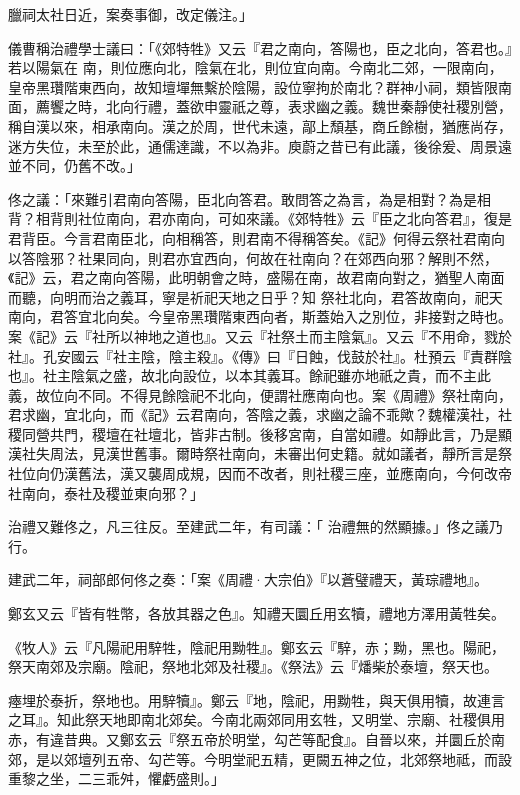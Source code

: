\begin{pinyinscope}
 臘祠太社日近，案奏事御，改定儀注。」



 儀曹稱治禮學士議曰：「《郊特牲》又云『君之南向，答陽也，臣之北向，答君也。』若以陽氣在
 南，則位應向北，陰氣在北，則位宜向南。今南北二郊，一限南向，皇帝黑瓚階東西向，故知壇墠無繫於陰陽，設位寧拘於南北？群神小祠，類皆限南面，薦饗之時，北向行禮，蓋欲申靈祇之尊，表求幽之義。魏世秦靜使社稷別營，稱自漢以來，相承南向。漢之於周，世代未遠，鄗上頹基，商丘餘樹，猶應尚存，迷方失位，未至於此，通儒達識，不以為非。庾蔚之昔已有此議，後徐爰、周景遠並不同，仍舊不改。」



 佟之議：「來難引君南向答陽，臣北向答君。敢問答之為言，為是相對？為是相背？相背則社位南向，君亦南向，可如來議。《郊特牲》云『臣之北向答君』，復是君背臣。今言君南臣北，向相稱答，則君南不得稱答矣。《記》何得云祭社君南向以答陰邪？社果同向，則君亦宜西向，何故在社南向？在郊西向邪？解則不然，《記》云，君之南向答陽，此明朝會之時，盛陽在南，故君南向對之，猶聖人南面而聽，向明而治之義耳，寧是祈祀天地之日乎？知
 祭社北向，君答故南向，祀天南向，君答宜北向矣。今皇帝黑瓚階東西向者，斯蓋始入之別位，非接對之時也。案《記》云『社所以神地之道也』。又云『社祭土而主陰氣』。又云『不用命，戮於社』。孔安國云『社主陰，陰主殺』。《傳》曰『日蝕，伐鼓於社』。杜預云『責群陰也』。社主陰氣之盛，故北向設位，以本其義耳。餘祀雖亦地祇之貴，而不主此義，故位向不同。不得見餘陰祀不北向，便謂社應南向也。案《周禮》祭社南向，君求幽，宜北向，而《記》云君南向，答陰之義，求幽之論不乖歟？魏權漢社，社稷同營共門，稷壇在社壇北，皆非古制。後移宮南，自當如禮。如靜此言，乃是顯漢社失周法，見漢世舊事。爾時祭社南向，未審出何史籍。就如議者，靜所言是祭社位向仍漢舊法，漢又襲周成規，因而不改者，則社稷三座，並應南向，今何改帝社南向，泰社及稷並東向邪？」



 治禮又難佟之，凡三往反。至建武二年，有司議：「
 治禮無的然顯據。」佟之議乃行。



 建武二年，祠部郎何佟之奏：「案《周禮·大宗伯》『以蒼璧禮天，黃琮禮地』。



 鄭玄又云『皆有牲幣，各放其器之色』。知禮天圜丘用玄犢，禮地方澤用黃牲矣。



 《牧人》云『凡陽祀用騂牲，陰祀用黝牲』。鄭玄云『騂，赤；黝，黑也。陽祀，祭天南郊及宗廟。陰祀，祭地北郊及社稷』。《祭法》云『燔柴於泰壇，祭天也。



 瘞埋於泰折，祭地也。用騂犢』。鄭云『地，陰祀，用黝牲，與天俱用犢，故連言之耳』。知此祭天地即南北郊矣。今南北兩郊同用玄牲，又明堂、宗廟、社稷俱用赤，有違昔典。又鄭玄云『祭五帝於明堂，勾芒等配食』。自晉以來，并圜丘於南郊，是以郊壇列五帝、勾芒等。今明堂祀五精，更闕五神之位，北郊祭地祗，而設重黎之坐，二三乖舛，懼虧盛則。」




\end{pinyinscope}
